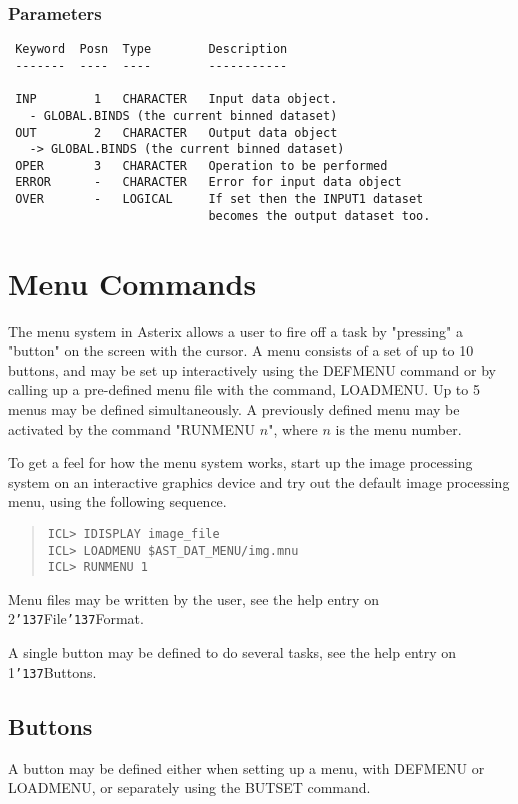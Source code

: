 \documentclass{book}
\renewcommand{\_}{{\tt\char'137}}     %
\begin{document}
\subsection{Parameters}
\begin{verbatim}
 Keyword  Posn  Type        Description
 -------  ----  ----        -----------

 INP        1   CHARACTER   Input data object.
   - GLOBAL.BINDS (the current binned dataset)
 OUT        2   CHARACTER   Output data object
   -> GLOBAL.BINDS (the current binned dataset)
 OPER       3   CHARACTER   Operation to be performed
 ERROR      -   CHARACTER   Error for input data object
 OVER       -   LOGICAL     If set then the INPUT1 dataset
                            becomes the output dataset too.

\end{verbatim}\chapter{Menu Commands}
The menu system in Asterix allows a user to fire off a task by "pressing"
a "button" on the screen with the cursor. A menu consists of a set of
up to 10 buttons, and may be set up interactively using the DEFMENU
command or by calling up a pre-defined menu file with the command, LOADMENU.
Up to 5 menus may be defined simultaneously. A previously defined menu
may be activated by the command "RUNMENU $n$", where
$n$ is the menu number.

To get a feel for how the menu system works, start up the image processing
system on an interactive graphics device and try out the default image
processing menu, using the following sequence.

\begin{quote}\begin{verbatim}
ICL> IDISPLAY image_file
ICL> LOADMENU $AST_DAT_MENU/img.mnu
ICL> RUNMENU 1
\end{verbatim}\end{quote}
Menu files may be written by the user, see the help entry on
2\_File\_Format.

A single button may be defined to do several tasks, see the help entry
on 1\_Buttons.

\section{Buttons}
A button may be defined either when setting up a menu, with DEFMENU or
LOADMENU, or separately using the BUTSET command.
\end{document}
